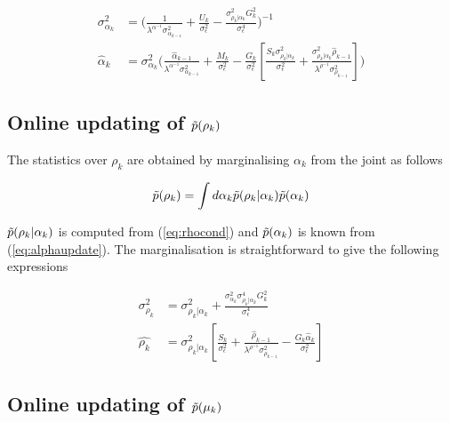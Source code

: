 \documentclass{article}
\begin{document}
\begin{equation}\label{eq:alphaupdate}
\begin{split}
\sigma^2_{\alpha_k} &= \bigg(\frac{1}{\lambda^{\alpha^{-1}}\sigma^{2}_{\alpha_{k-1}}} + \frac{U_k}{\sigma^{2}_\epsilon} - \frac{\sigma^2_{\rho_{k}|\alpha_k}G_k^2}{\sigma^{4}_\epsilon} \bigg)^{-1} \\
\hat{\alpha}_k &= \sigma^2_{\alpha_k} \bigg(\frac{\hat{\alpha}_{k-1}}{\lambda^{\alpha^{-1}}\sigma^{2}_{\alpha_{k-1}}} + \frac{M_k}{\sigma^{2}_\epsilon} - \frac{G_k}{\sigma^{2}_\epsilon}\left[
\frac{S_k\sigma^2_{\rho_{k}|\alpha_k}}{\sigma^{2}_\epsilon}  + \frac{\sigma^2_{\rho_{k}|\alpha_k}\hat{\rho}_{k-1}}{\lambda^{\rho^{-1}}\sigma^{2}_{\rho_{k-1}}} \right]\bigg)
\end{split}
\end{equation}

\subsection{Online updating of $\tilde{p}(\rho_k)$}

The statistics over $\rho_k$ are obtained by marginalising $\alpha_k$ from the joint as follows

\begin{equation}
 \tilde{p}(\rho_{k}) = \int d\alpha_k \tilde{p}(\rho_{k}| \alpha_k)\tilde{p}(\alpha_k)
 \end{equation}

$\tilde{p}(\rho_{k}| \alpha_k)$ is computed from (\ref{eq:rhocond}) and $\tilde{p}(\alpha_k)$ is known from (\ref{eq:alphaupdate}). The marginalisation is straightforward to give the following expressions

\begin{equation}
\begin{split}
\sigma^2_{\rho_k} &= \sigma^2_{\rho_k | \alpha_k}  + \frac{\sigma^2_{\alpha_k}\sigma^4_{\rho_k|\alpha_k}G_k^2}{\sigma^4_\epsilon} \\
\hat{\rho_k} &= \sigma^2_{\rho_k | \alpha_k} \left[\frac{S_k}{\sigma^2_\epsilon}  + \frac{\hat{\rho}_{k-1}}{\lambda^{\rho^{-1}}\sigma^2_{\rho_{k-1}}} - \frac{G_k\hat{\alpha}_k}{\sigma^2_\epsilon} \right]
\end{split}
\end{equation}


\subsection{Online updating of $\tilde{p}(\mu_k)$}
\end{document}
